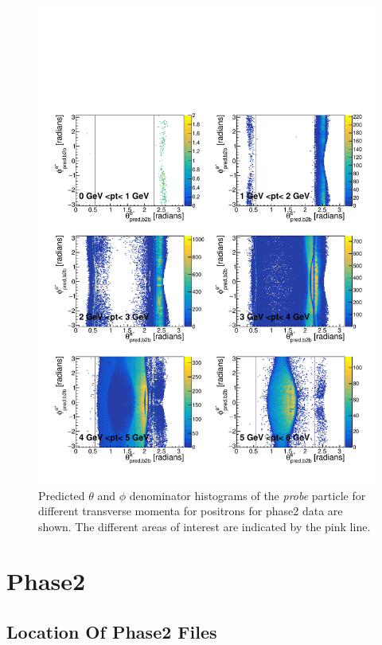\documentclass[a4paper,11pt,twosided,final,german,openbib,pdftex,listof=totoc,bibliography=totoc]{scrbook}
\begin{document}
\begin{appendix}
\begin{figure}[h!]
	\includegraphics[width=\textwidth]{Plots/master/RTPtMepE_Data.pdf}
	\caption[Enumerator $\theta$-$\phi$ Positron Transverse Momentum Phase2 Data]{Predicted $\theta$ and $\phi$ denominator histograms of the \textit{probe} particle for different transverse momenta for positrons for phase2 data are shown. The different areas of interest are indicated by the pink line.}
	\label{plt:RTtPMepE_Data}
\end{figure}


\clearpage
\section{Phase2}
\label{A:2}


\subsection{Location Of Phase2 Files}


\end{appendix}
\end{document}
